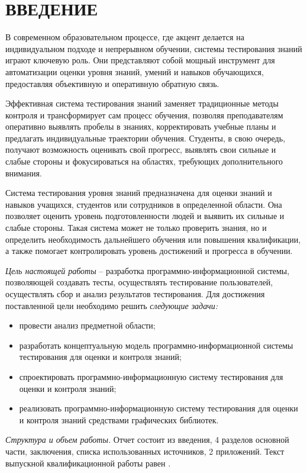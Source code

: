 \section*{ВВЕДЕНИЕ}

В современном образовательном процессе, где акцент делается на индивидуальном подходе и непрерывном обучении, системы тестирования знаний играют ключевую роль. Они представляют собой мощный инструмент для автоматизации оценки уровня знаний, умений и навыков обучающихся, предоставляя объективную и оперативную обратную связь.

Эффективная система тестирования знаний заменяет традиционные методы контроля и трансформирует сам процесс обучения, позволяя преподавателям оперативно выявлять пробелы в знаниях, корректировать учебные планы и предлагать индивидуальные траектории обучения. Студенты, в свою очередь, получают возможность оценивать свой прогресс, выявлять свои сильные и слабые стороны и фокусироваться на областях, требующих дополнительного внимания.

Система тестирования уровня знаний предназначена для оценки знаний и навыков учащихся, студентов или сотрудников в определенной области. Она позволяет оценить уровень подготовленности людей и выявить их сильные и слабые стороны. Такая система может не только проверить знания, но и определить необходимость дальнейшего обучения или повышения квалификации, а также помогает контролировать уровень достижений и прогресса в обучении.

\emph{Цель настоящей работы} – разработка программно-информационной системы, позволяющей создавать тесты, осуществлять тестирование пользователей, осуществлять сбор и анализ результатов тестирования. Для достижения поставленной цели необходимо решить \emph{следующие задачи:}
\begin{itemize}
\item провести анализ предметной области;
\item разработать концептуальную модель программно-информационной системы тестирования для оценки и контроля знаний;
\item спроектировать программно-информационную систему тестирования для оценки и контроля знаний;
\item реализовать программно-информационную систему тестирования для оценки и контроля знаний средствами графических библиотек.
\end{itemize}

\emph{Структура и объем работы.} Отчет состоит из введения, 4 разделов основной части, заключения, списка использованных источников, 2 приложений. Текст выпускной квалификационной работы равен .

